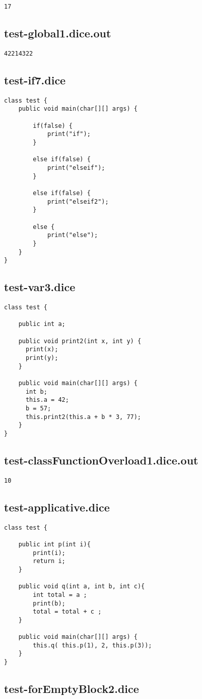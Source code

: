 \begin{verbatim}
17
\end{verbatim}\pagebreak\subsection{test-global1.dice.out}
\begin{verbatim}
42214322
\end{verbatim}\pagebreak\subsection{test-if7.dice}
\begin{verbatim}
class test {
	public void main(char[][] args) {

		if(false) { 
			print("if");
		} 
		
		else if(false) { 
			print("elseif"); 
		}

		else if(false) {
			print("elseif2");
		}

		else {
			print("else");
		}
	}
}
\end{verbatim}\pagebreak\subsection{test-var3.dice}
\begin{verbatim}
class test {

	public int a;

	public void print2(int x, int y) {
	  print(x);
	  print(y);
	}

	public void main(char[][] args) {
	  int b;
	  this.a = 42;
	  b = 57;
	  this.print2(this.a + b * 3, 77);
	}
}
\end{verbatim}\pagebreak\subsection{test-classFunctionOverload1.dice.out}
\begin{verbatim}
10
\end{verbatim}\pagebreak\subsection{test-applicative.dice}
\begin{verbatim}
class test {
	
	public int p(int i){ 
		print(i); 
		return i; 
	}

	public void q(int a, int b, int c){ 
		int total = a ; 
		print(b); 
		total = total + c ; 
	}
	
	public void main(char[][] args) {
		this.q( this.p(1), 2, this.p(3));
	}
}
\end{verbatim}\pagebreak\subsection{test-forEmptyBlock2.dice}
